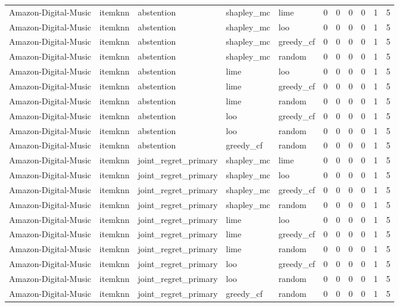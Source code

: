 \begin{table}[t]
{\begin{tabular}{lllllrrrrrr}
Amazon-Digital-Music & itemknn & abstention & shapley\_mc & lime & 0 & 0 & 0 & 0 & 1 & 5 \\
Amazon-Digital-Music & itemknn & abstention & shapley\_mc & loo & 0 & 0 & 0 & 0 & 1 & 5 \\
Amazon-Digital-Music & itemknn & abstention & shapley\_mc & greedy\_cf & 0 & 0 & 0 & 0 & 1 & 5 \\
Amazon-Digital-Music & itemknn & abstention & shapley\_mc & random & 0 & 0 & 0 & 0 & 1 & 5 \\
Amazon-Digital-Music & itemknn & abstention & lime & loo & 0 & 0 & 0 & 0 & 1 & 5 \\
Amazon-Digital-Music & itemknn & abstention & lime & greedy\_cf & 0 & 0 & 0 & 0 & 1 & 5 \\
Amazon-Digital-Music & itemknn & abstention & lime & random & 0 & 0 & 0 & 0 & 1 & 5 \\
Amazon-Digital-Music & itemknn & abstention & loo & greedy\_cf & 0 & 0 & 0 & 0 & 1 & 5 \\
Amazon-Digital-Music & itemknn & abstention & loo & random & 0 & 0 & 0 & 0 & 1 & 5 \\
Amazon-Digital-Music & itemknn & abstention & greedy\_cf & random & 0 & 0 & 0 & 0 & 1 & 5 \\
Amazon-Digital-Music & itemknn & joint\_regret\_primary & shapley\_mc & lime & 0 & 0 & 0 & 0 & 1 & 5 \\
Amazon-Digital-Music & itemknn & joint\_regret\_primary & shapley\_mc & loo & 0 & 0 & 0 & 0 & 1 & 5 \\
Amazon-Digital-Music & itemknn & joint\_regret\_primary & shapley\_mc & greedy\_cf & 0 & 0 & 0 & 0 & 1 & 5 \\
Amazon-Digital-Music & itemknn & joint\_regret\_primary & shapley\_mc & random & 0 & 0 & 0 & 0 & 1 & 5 \\
Amazon-Digital-Music & itemknn & joint\_regret\_primary & lime & loo & 0 & 0 & 0 & 0 & 1 & 5 \\
Amazon-Digital-Music & itemknn & joint\_regret\_primary & lime & greedy\_cf & 0 & 0 & 0 & 0 & 1 & 5 \\
Amazon-Digital-Music & itemknn & joint\_regret\_primary & lime & random & 0 & 0 & 0 & 0 & 1 & 5 \\
Amazon-Digital-Music & itemknn & joint\_regret\_primary & loo & greedy\_cf & 0 & 0 & 0 & 0 & 1 & 5 \\
Amazon-Digital-Music & itemknn & joint\_regret\_primary & loo & random & 0 & 0 & 0 & 0 & 1 & 5 \\
Amazon-Digital-Music & itemknn & joint\_regret\_primary & greedy\_cf & random & 0 & 0 & 0 & 0 & 1 & 5 \\

\end{tabular}}
\end{table}
